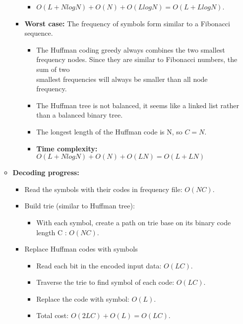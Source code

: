 \begin{enumerate}[label=\textbf{\Alph*.}]
\begin{itemize}
\begin{itemize}
                \begin{itemize}
                    \item $O(L + NlogN) + O(N) + O(LlogN) = O(L + LlogN)$.
                \end{itemize}
                \item \textbf{Worst case:} The frequency of symbols form similar to a Fibonacci sequence.
                \begin{itemize}
                    \item The Huffman coding greedy always combines the two smallest frequency nodes. Since they are similar to Fibonacci numbers, the sum of two \\smallest frequencies will always be smaller than all node frequency. 
                    \item The Huffman tree is not balanced, it seems like a linked list rather than a balanced binary tree.
                    \item The longest length of the Huffman code is N, so $C = N$.
                    \item \textbf{Time complexity:} $O(L + NlogN) + O(N) + O(LN) = O(L + LN)$
                \end{itemize}
            \end{itemize}
            \item \textbf{Decoding progress:}
            \begin{itemize}
                \item Read the symbols with their codes in frequency file: $O(NC)$.
                \item Build trie (similar to Huffman tree):
                \begin{itemize}
                    \item With each symbol, create a path on trie base on its binary code length C : $O(NC)$.
                \end{itemize}
                \item Replace Huffman codes with symbols
                \begin{itemize}
                    \item Read each bit in the encoded input data: $O(LC)$.
                    \item Traverse the trie to find symbol of each code: $O(LC)$.
                    \item Replace the code with symbol: $O(L)$.
                    \item Total cost: $O(2LC) + O(L) = O(LC)$.

\end{itemize}
\end{itemize}
\end{itemize}
\end{enumerate}
